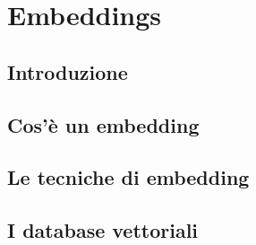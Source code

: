 \chapter{Embeddings}
\label{Embeddings}
\section{Introduzione}
\section{Cos'è un embedding}
\section{Le tecniche di embedding}
\section{I database vettoriali}